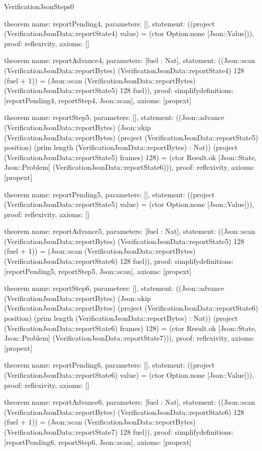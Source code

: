 \begin{lexlean}{VerificationJsonSteps0}
\begin{semanticmodule}
theorem{
  name: reportPending4,
  parameters: [],
  statement: ((project (VerificationJsonData::reportState4) value) = (ctor Option.none [Json::Value])),
  proof: reflexivity{},
  axioms: []
}

theorem{
  name: reportAdvance4,
  parameters: [fuel : Nat],
  statement: ((Json::scan (VerificationJsonData::reportBytes) (VerificationJsonData::reportState4) 128 (fuel + 1)) = (Json::scan (VerificationJsonData::reportBytes) (VerificationJsonData::reportState5) 128 fuel)),
  proof: simplify{definitions: [reportPending4, reportStep4, Json::scan]},
  axioms: [propext]
}

theorem{
  name: reportStep5,
  parameters: [],
  statement: ((Json::advance (VerificationJsonData::reportBytes) (Json::skip (VerificationJsonData::reportBytes) (project (VerificationJsonData::reportState5) position) (prim length (VerificationJsonData::reportBytes) : Nat)) (project (VerificationJsonData::reportState5) frames) 128) = (ctor Result.ok [Json::State, Json::Problem] (VerificationJsonData::reportState6))),
  proof: reflexivity{},
  axioms: [propext]
}

theorem{
  name: reportPending5,
  parameters: [],
  statement: ((project (VerificationJsonData::reportState5) value) = (ctor Option.none [Json::Value])),
  proof: reflexivity{},
  axioms: []
}

theorem{
  name: reportAdvance5,
  parameters: [fuel : Nat],
  statement: ((Json::scan (VerificationJsonData::reportBytes) (VerificationJsonData::reportState5) 128 (fuel + 1)) = (Json::scan (VerificationJsonData::reportBytes) (VerificationJsonData::reportState6) 128 fuel)),
  proof: simplify{definitions: [reportPending5, reportStep5, Json::scan]},
  axioms: [propext]
}

theorem{
  name: reportStep6,
  parameters: [],
  statement: ((Json::advance (VerificationJsonData::reportBytes) (Json::skip (VerificationJsonData::reportBytes) (project (VerificationJsonData::reportState6) position) (prim length (VerificationJsonData::reportBytes) : Nat)) (project (VerificationJsonData::reportState6) frames) 128) = (ctor Result.ok [Json::State, Json::Problem] (VerificationJsonData::reportState7))),
  proof: reflexivity{},
  axioms: [propext]
}

theorem{
  name: reportPending6,
  parameters: [],
  statement: ((project (VerificationJsonData::reportState6) value) = (ctor Option.none [Json::Value])),
  proof: reflexivity{},
  axioms: []
}

theorem{
  name: reportAdvance6,
  parameters: [fuel : Nat],
  statement: ((Json::scan (VerificationJsonData::reportBytes) (VerificationJsonData::reportState6) 128 (fuel + 1)) = (Json::scan (VerificationJsonData::reportBytes) (VerificationJsonData::reportState7) 128 fuel)),
  proof: simplify{definitions: [reportPending6, reportStep6, Json::scan]},
  axioms: [propext]
}


\end{semanticmodule}
\end{lexlean}
